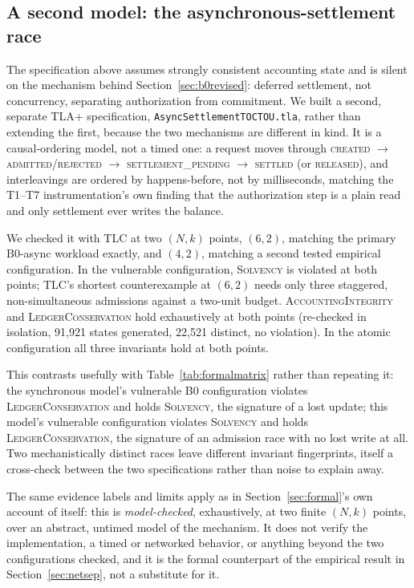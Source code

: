\documentclass[manuscript,review]{acmart}
\begin{document}
\subsection{A second model: the asynchronous-settlement race}
\label{sec:asyncformal}
The specification above assumes strongly consistent accounting state and is silent on
the mechanism behind Section~\ref{sec:b0revised}: deferred settlement, not concurrency,
separating authorization from commitment. We built a second, separate TLA+
specification, \texttt{AsyncSettlementTOCTOU.tla}, rather than extending the first,
because the two mechanisms are different in kind. It is a causal-ordering model, not a
timed one: a request moves through \textsc{created}
$\to$ \textsc{admitted}/\textsc{rejected} $\to$ \textsc{settlement\_pending} $\to$
\textsc{settled} (or \textsc{released}), and interleavings are ordered by happens-before,
not by milliseconds, matching the T1--T7 instrumentation's own finding that the
authorization step is a plain read and only settlement ever writes the balance.

We checked it with TLC at two $(N,k)$ points, $(6,2)$, matching the primary B0-async
workload exactly, and $(4,2)$, matching a second tested empirical configuration. In the
vulnerable configuration, \textsc{Solvency} is violated at both points; TLC's shortest
counterexample at $(6,2)$ needs only three staggered, non-simultaneous admissions against
a two-unit budget. \textsc{AccountingIntegrity} and \textsc{LedgerConservation} hold
exhaustively at both points (re-checked in isolation, 91{,}921 states generated, 22{,}521
distinct, no violation). In the atomic configuration all three invariants hold at both
points.

This contrasts usefully with Table~\ref{tab:formalmatrix} rather than repeating it: the
synchronous model's vulnerable B0 configuration violates \textsc{LedgerConservation} and
holds \textsc{Solvency}, the signature of a lost update; this model's vulnerable
configuration violates \textsc{Solvency} and holds \textsc{LedgerConservation}, the
signature of an admission race with no lost write at all. Two mechanistically distinct
races leave different invariant fingerprints, itself a cross-check between the two
specifications rather than noise to explain away.

The same evidence labels and limits apply as in Section~\ref{sec:formal}'s own account of
itself: this is \emph{model-checked}, exhaustively, at two finite $(N,k)$ points, over an
abstract, untimed model of the mechanism. It does not verify the implementation, a timed
or networked behavior, or anything beyond the two configurations checked, and it is the
formal counterpart of the empirical result in Section~\ref{sec:netsep}, not a substitute
for it.
\end{document}
